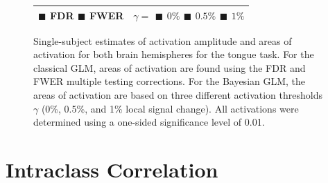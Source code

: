 \documentclass{article}
\begin{document}
\begin{figure}
\begin{tabularx}{\textwidth}{|X|X|}
			\multicolumn{1}{|c|}{\textcolor[HTML]{00BA38}{$\blacksquare$} FDR \textcolor[HTML]{619CFF}{$\blacksquare$} FWER } &
			\multicolumn{1}{c|}{$\gamma = $ \textcolor[HTML]{F0F921}{$\blacksquare$} $0\%$ \textcolor[HTML]{F89441}{$\blacksquare$} $0.5\%$ \textcolor[HTML]{CC4678}{$\blacksquare$} $1\%$}\\
			\hline
		\end{tabularx}
	\caption{Single-subject estimates of activation amplitude and areas of activation for both brain hemispheres for the tongue task. For the classical GLM, areas of activation are found using the FDR and FWER multiple testing corrections. For the Bayesian GLM, the areas of activation are based on three different activation thresholds $\gamma$ (0\%, 0.5\%, and 1\% local signal change). All activations were determined using a one-sided significance level of 0.01.}
	\label{fig:tongue_est_and_act}
\end{figure}
	
	\newpage

	\section{Intraclass Correlation}
	
\end{document}
